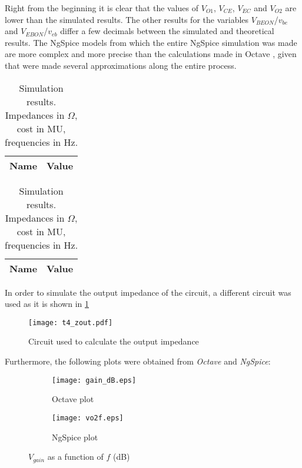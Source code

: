 Right from the beginning it is clear that the values of $V_{O1}$, $V_{CE}$, $V_{EC}$ and $V_{O2}$ are lower than the simulated results. The other results for the variables $V_{BEON}$/$v_{be}$ and $V_{EBON}$/$v_{eb}$ differ a few decimals between the simulated and theoretical results. The NgSpice \cite{bib:ngspice} models from which the entire NgSpice simulation was made are more complex and more precise than the calculations made in Octave \cite{bib:octave}, given that were made several approximations along the entire process.
\begin{table}[H]
\parbox{.5\linewidth}{
\centering                
\def\arraystretch{1}        %

\begin{tabular}{c|c}        %
\hline                      %

\textbf{Name}  & \textbf{Value}\\     
\hline                      %

\hline                      %
\end{tabular}
\captionsetup{justification=justified, margin=0.5cm} 
\caption{Theoretical results. Impedances in $\Omega$, cost in MU, frequencies in Hz.}
\label{tab9}
}
\hfill
\parbox{.5\linewidth}{
\centering
\def\arraystretch{1}

\begin{tabular}{c|c}
\hline    
\textbf{Name} & \textbf{Value} \\ \hline

\hline
\end{tabular}
\captionsetup{justification=justified, margin=0.5cm} 
\caption{Simulation results. Impedances in $\Omega$, cost in MU, frequencies in Hz.}
\label{tab10}
}
\end{table}

In order to simulate the output impedance of the circuit, a different circuit was used as it is shown in \ref{z_out}
 
\begin{figure}[H] \centering
\texttt{[image: t4\_zout.pdf]}
\caption{Circuit used to calculate the output impedance}
\label{z_out}
\end{figure}


Furthermore, the following plots were obtained from \emph{Octave} and \emph{NgSpice}:
\begin{figure}[H]
\centering
\begin{subfigure}{0.5\textwidth}
  \centering
  \texttt{[image: gain\_dB.eps]}
  \caption{Octave plot}
  \label{fig:sub1}
\end{subfigure}%
\begin{subfigure}{.5\textwidth}
  \centering
  \texttt{[image: vo2f.eps]}
  \caption{NgSpice plot}
  \label{fig:sub2}
\end{subfigure}
\caption{$V_{gain}$ as a function of $f$ (dB)}
\label{fig:test}
\end{figure}

